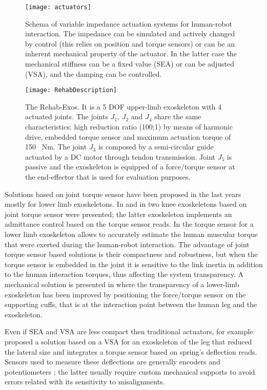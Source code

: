 %
\begin{figure}[]
	\centering
	\texttt{[image: actuators]}
	\caption{Schema of variable impedance actuation systems for human-robot interaction. The impedance can be simulated and  actively changed by control (this relies on position and torque sensors) or can be an inherent mechanical property of the actuator. In the latter case the mechanical stiffness can be a fixed value (SEA) or can be adjusted (VSA), and the damping can be controlled.}
	\label{fig:exosActuators}
\end{figure}
%
\begin{figure}[htb]
	\centering
	\texttt{[image: RehabDescription]} 
	\caption{The Rehab-Exos. It is a 5 DOF upper-limb exoskeleton  with 4 actuated joints. The joints $J_1$, $J_2$ and $J_4$ share the same characteristics: high reduction ratio (100:1) by means of harmonic drive, embedded torque sensor and maximum actuation torque of 150 \ Nm. The joint $J_3$ is composed by a semi-circular guide actuated by a DC motor through tendon transmission. Joint $J_5$ is passive and the exoskeleton is equipped of a force/torque sensor at the end-effector that is used for evaluation purposes.}
	\label{fig:rehabexos1} 
\end{figure}
%
\par Solutions based on joint torque sensor have been proposed in the last years mostly for lower limb exoskeletons. In \cite{kim2015design} and in \cite{aguirre2011design} two knee exoskeletons based on joint torque sensor were presented; the latter exoskeleton implements an admittance control based on the torque sensor reads. In \cite{hwang2015method} the torque sensor for a lower limb exoskeleton allows to accurately estimate the human muscular torque that were exerted during the human-robot interaction. The advantage of joint torque sensor based solutions is their compactness and robustness, but when the torque sensor is embedded in the joint it is sensitive to the link inertia in addition to the human interaction torques, thus affecting the system transparency. A mechanical solution is presented in \cite{zanotto2013improving} where the transparency of a lower-limb exoskeleton has been improved by positioning the force/torque sensor on the supporting cuffs, that is at the interaction point between the human leg and the exoskeleton.
\par Even if SEA and VSA are less compact then traditional actuators, for example \cite{cestari2014ares} proposed a solution based on a VSA for an exoskeleton of the leg that reduced the lateral size and integrates a torque sensor based on spring's deflection reads. Sensors used to measure these deflections are generally encoders \cite{dos2017design} and potentiometers \cite{junior2016series}; the latter usually require custom mechanical supports to avoid errors related with its sensitivity to misalignments.

